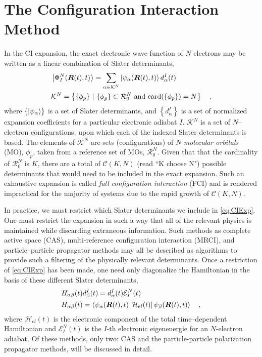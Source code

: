 \section{The Configuration Interaction Method}
\label{sec:ci}

In the CI expansion, the exact electronic wave function of $N$ electrons may be
written as a linear combination of Slater determinants,
\begin{align}
&\left\vert \Phi^N_I (\boldsymbol{R}(t),t) \right\rangle = \sum_{\alpha \in \mathcal{K}^N}  
  \left\vert \psi_\alpha (\boldsymbol{R}(t),t) \right\rangle d^I_\alpha(t)
\label{eq:CIExp} \\
& \mathcal{K}^N = \left\lbrace \{ \phi_p \} \text{ }\vert\text{ } \{ \phi_p \} \subset
\mathcal{R}_0^N \text{ and } \mathrm{card}(\{ \phi_p \}) = N \right\rbrace
\quad ,
\end{align}
where $\left\lbrace\left\vert \psi_\alpha \right\rangle\right\rbrace$ is a set of Slater
determinants, and $\left\lbrace d^I_\alpha \right\rbrace$ is a set of normalized
expansion coefficients for a particular electronic adiabat $I$. $\mathcal{K}^N$ is
a set of $N$--electron configurations, upon which each of the indexed Slater
determinants is based. The elements of $\mathcal{K}^N$ are sets (configurations)
of $N$ \emph{molecular orbitals} (MO), $\phi_p$, taken from a reference set of MOs,
$\mathcal{R}^N_0$.  
Given that that the cardinality of $\mathcal{R}^N_0$ is $K$, there are a total
of $\mathcal{C}(K,N)$ (read ``K choose N") possible determinants that would need
to be included in the exact expansion. Such an exhaustive expansion is called
\emph{full configuration interaction} (FCI) and is rendered impractical for the
majority of systems due to the rapid growth of $\mathcal{C}(K,N)$.  

In practice, we  must restrict which Slater determinants we include in
\cref{eq:CIExp}.  One must restrict the expansion in such a way that all of the
relevant physics is maintained while discarding extraneous information. Such
methods as complete active space (CAS), multi-reference configuration
interaction (MRCI), and particle--particle propagator methods may all be
described as algorithms to provide such a filtering of the physically relevant
determinants.  Once a restriction of \cref{eq:CIExp} has been made, one need
only diagonalize the Hamiltonian in the basis of these different Slater
determinants,
\begin{align}
&H_{\alpha\beta}(t) d_\beta^I(t) = d_\alpha^I(t) \mathcal{E}^N_I(t)
\label{eq:CIEig}\\
&H_{\alpha\beta}(t) =
\left\langle \psi_\alpha(\boldsymbol{R}(t),t) \left\vert \mathcal{H}_{el}(t) \right\vert \psi_\beta(\boldsymbol{R}(t),t) \right\rangle
\quad,
\end{align}
where $\mathcal{H}_{el}(t)$ is the electronic component of the total
time--dependent Hamiltonian and $\mathcal{E}^N_I(t)$ is the $I$-th electronic
eigenenergie for an $N$-electron adiabat. 
Of these methods, only two: CAS and the particle-particle polarization
propagator methods, will be discussed in detail. 

